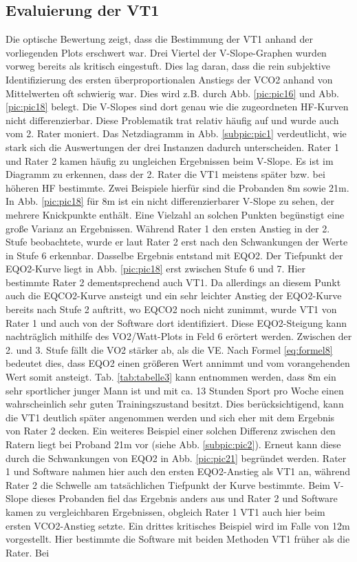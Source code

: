 \subsection{Evaluierung der VT1}

Die optische Bewertung zeigt, dass die Bestimmung der VT1 anhand der vorliegenden Plots erschwert war. Drei Viertel der V-Slope-Graphen wurden vorweg bereits als kritisch eingestuft. Dies lag daran, dass die rein subjektive Identifizierung des ersten überproportionalen Anstiegs der \acs{VCO2} anhand von Mittelwerten oft schwierig war. Dies wird z.B. durch Abb. \ref{pic:pic16} und Abb. \ref{pic:pic18} belegt. Die V-Slopes sind dort genau wie die zugeordneten \acs{HF}-Kurven nicht differenzierbar. Diese Problematik trat relativ häufig auf und wurde auch vom 2. Rater moniert. Das Netzdiagramm in Abb. \ref{subpic:pic1} verdeutlicht, wie stark sich die Auswertungen der drei Instanzen dadurch unterscheiden. Rater 1 und Rater 2 kamen häufig zu ungleichen Ergebnissen beim V-Slope. Es ist im Diagramm zu erkennen, dass der 2. Rater die VT1 meistens später bzw. bei höheren \acs{HF} bestimmte. Zwei Beispiele hierfür sind die Probanden 8m sowie 21m. In Abb. \ref{pic:pic18} für 8m ist ein nicht differenzierbarer V-Slope zu sehen, der mehrere Knickpunkte enthält. Eine Vielzahl an solchen Punkten begünstigt eine große Varianz an Ergebnissen. Während Rater 1 den ersten Anstieg in der 2. Stufe beobachtete, wurde er laut Rater 2 erst nach den Schwankungen der Werte in Stufe 6 erkennbar. Dasselbe Ergebnis entstand mit \acs{EQO2}. Der Tiefpunkt der \acs{EQO2}-Kurve liegt in Abb. \ref{pic:pic18} erst zwischen Stufe 6 und 7. Hier bestimmte Rater 2 dementsprechend auch VT1. Da allerdings an diesem Punkt auch die \acs{EQCO2}-Kurve ansteigt und ein sehr leichter Anstieg der \acs{EQO2}-Kurve bereits nach Stufe 2 auftritt, wo \acs{EQCO2} noch nicht zunimmt, wurde VT1 von Rater 1 und auch von der Software dort identifiziert. Diese \acs{EQO2}-Steigung kann nachträglich mithilfe des \acs{VO2}/Watt-Plots in Feld 6 erörtert werden. Zwischen der 2. und 3. Stufe fällt die \acs{VO2} stärker ab, als die \acs{VE}. Nach Formel \eqref{eq:formel8} bedeutet dies, dass \acs{EQO2} einen größeren Wert annimmt und vom vorangehenden Wert somit ansteigt. Tab. \ref{tab:tabelle3} kann entnommen werden, dass 8m ein sehr sportlicher junger Mann ist und mit ca. 13 Stunden Sport pro Woche einen wahrscheinlich sehr guten Trainingszustand besitzt. Dies berücksichtigend, kann die VT1 deutlich später angenommen werden und sich eher mit dem Ergebnis von Rater 2 decken. Ein weiteres Beispiel einer solchen Differenz zwischen den Ratern liegt bei Proband 21m vor (siehe Abb. \ref{subpic:pic2}). Erneut kann diese durch die Schwankungen von \acs{EQO2} in Abb. \ref{pic:pic21} begründet werden. Rater 1 und Software nahmen hier auch den ersten \acs{EQO2}-Anstieg als VT1 an, während Rater 2 die Schwelle am tatsächlichen Tiefpunkt der Kurve bestimmte. Beim V-Slope dieses Probanden fiel das Ergebnis anders aus und Rater 2 und Software kamen zu vergleichbaren Ergebnissen, obgleich Rater 1 VT1 auch hier beim ersten \acs{VCO2}-Anstieg setzte. Ein drittes kritisches Beispiel wird im Falle von 12m vorgestellt. Hier bestimmte die Software mit beiden Methoden VT1 früher als die Rater. Bei 